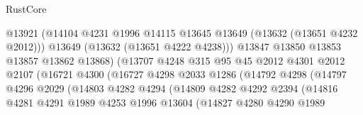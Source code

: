 \begin{lexlean}{RustCore}
\begin{coremodule}
                                      @13921
                                      (@14104
                                        @4231
                                        @1996
                                        @14115
                                        @13645
                                        @13649
                                        (@13632 (@13651 @4232 @2012)))
                                      @13649
                                      (@13632 (@13651 @4222 @4238)))
                                    @13847
                                    @13850
                                    @13853
                                    @13857
                                    @13862
                                    @13868)
                                  (@13707
                                    @4248
                                    @315
                                    @95
                                    @45
                                    @2012
                                    @4301
                                    @2012
                                    @2107
                                    (@16721
                                      @4300
                                      (@16727
                                        @4298
                                        @2033
                                        @1286
                                        (@14792
                                          @4298
                                          (@14797
                                            @4296
                                            @2029
                                            (@14803
                                              @4282
                                              @4294
                                              (@14809
                                                @4282
                                                @4292
                                                @2394
                                                (@14816
                                                  @4281
                                                  @4291
                                                  @1989
                                                  @4253
                                                  @1996
                                                  @13604
                                                  (@14827
                                                    @4280
                                                    @4290
                                                    @1989

\end{coremodule}
\end{lexlean}
